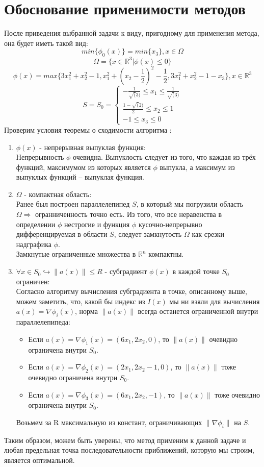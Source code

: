 \documentclass[main.tex]{subfiles}
\begin{document}
\section{Обоснование применимости методов}
После приведения выбранной задачи к виду, пригодному для применения метода, она будет иметь такой вид: 
$$min\{\phi_0(x)\} = min\{x_3\}, x \in \Omega$$
$$\Omega = \{x \in \mathds{R}^3 | \phi(x) \leq 0\}$$
$$\phi(x) = max\{3x_1^2 + x_2^2 - 1, x_1^2 + (x_2 -\frac{1}{2})^2 - \frac{1}{2}, 3x_1^2 + x_2^2 - 1 - x_3\}, x \in \mathds{R}^3$$
\begin{equation*}
S = S_0 = 
\begin{cases}
-\frac{1}{\sqrt(3)} \leq x_1 \leq \frac{1}{\sqrt(3)}\\
\frac{1-\sqrt(2)}{2} \leq x_2 \leq 1\\
-1 \leq x_3 \leq 0
\end{cases}
\end{equation*}
Проверим условия теоремы о сходимости алгоритма \cite{petuh}:
\begin{enumerate}
	\item $\phi(x)$ - непрерывная выпуклая функция:\\
	Непрерывность $\phi$ очевидна.
	Выпуклость следует из того, что каждая из трёх функций, максимумом из которых является $\phi$ выпукла, а максимум из выпуклых функций -- выпуклая функция.
	\item $\Omega$ - компактная область:\\
	Ранее был построен параллелепипед $S$, в который мы погрузили область $\Omega \Longrightarrow$ огранниченность точно есть.
	Из того, что все неравенства в определении $\phi$ нестрогие и функция $\phi$ кусочно-непрерывно дифференцируемая в области $S$, следует замкнутость $\varOmega$ как срезки надграфика $\phi$.\\
	Замкнутые ограниченные множества в $\mathds{R}^n$ компактны.
	\item $\forall x \in S_0 \hookrightarrow \|a(x)\| \leq R$ - субградиент $\phi(x)$ в каждой точке $S_0$ ограничен:\\
	Согласно алгоритму вычисления субградиента в точке, описанному выше, можем заметить, что, какой бы индекс из $I(x)$ мы ни взяли для вычисления $a(x) = \nabla \phi_i(x)$, норма $\|a(x)\|$ всегда останется ограниченной внутри параллелепипеда:
	\begin{itemize}
		\item Если $a(x) = \nabla\phi_1(x) = (6x_1, 2x_2, 0)$, то $\|a(x)\|$ очевидно ограничена внутри $S_0$.
		\item Если $a(x) = \nabla\phi_2(x) = (2x_1, 2x_2 - 1, 0)$, то $\|a(x)\|$ тоже очевидно ограничена внутри $S_0$.
		\item Если $a(x) = \nabla\phi_3(x) = (6x_1, 2x_2, -1)$, то $\|a(x)\|$ тоже очевидно ограничена внутри $S_0$.
	\end{itemize}
	Возьмем за R максимальную из констант, ограничивающих $\|\nabla\phi_i\|$ на $S$.
\end{enumerate}
Таким образом, можем быть уверены, что метод применим к данной задаче и любая предельная точка последовательности приближений, которую мы строим, является оптимальной.
\end{document}
